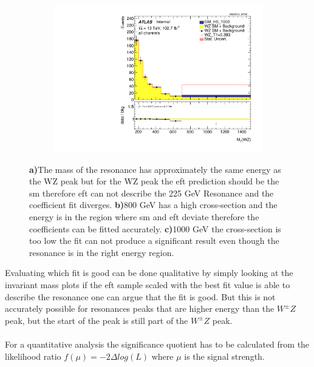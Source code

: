 \documentclass[../Bachelorarbeit.tex]{subfiles}
\begin{document}
\begin{figure}[h]
\begin{subfigure}{0.3\textwidth}
        \caption{}
    \end{subfigure}
    \begin{subfigure}{0.3\textwidth}
        \includegraphics[width=\textwidth]{Plots/ALL_MTWZ_right_color/GM_H5_1000/T1/2022-05-07/VBSSR/all_VV_MTWZ.pdf}
        \caption{}
    \end{subfigure}
    \caption{\textbf{a)}The mass of the resonance has approximately the same energy as the WZ peak but for the WZ peak the \acrshort{eft} prediction
        should be the \acrshort{sm} therefore \acrshort{eft} can not describe the 225 GeV Resonance and the coefficient fit diverges.
        \textbf{b)}800 GeV has a high cross-section and the energy is in the region where \acrshort{sm} and \acrshort{eft} deviate therefore the coefficients can be fitted accurately.
        \textbf{c)}1000 GeV the cross-section is too low the fit can not produce a significant result even though the resonance is in the right energy region.}
    \label{fig:S1_with_fit_diffrence_225}
\end{figure}
Evaluating which fit is good can be done qualitative by simply looking at the invariant mass plots if the \acrshort{eft} sample scaled with the best fit value is able to describe
the resonance one can argue that the fit is good. But this is not accurately possible for resonances peaks that are higher energy than the $W^{\pm}Z$ peak, but the start of the peak is still part of the $W^{\pm}Z$ peak.\\\\
For a quantitative analysis the significance quotient has to be calculated from the likelihood ratio $f(\mu)=-2\Delta log(L)$ where $\mu$ is the signal strength.
\end{document}
